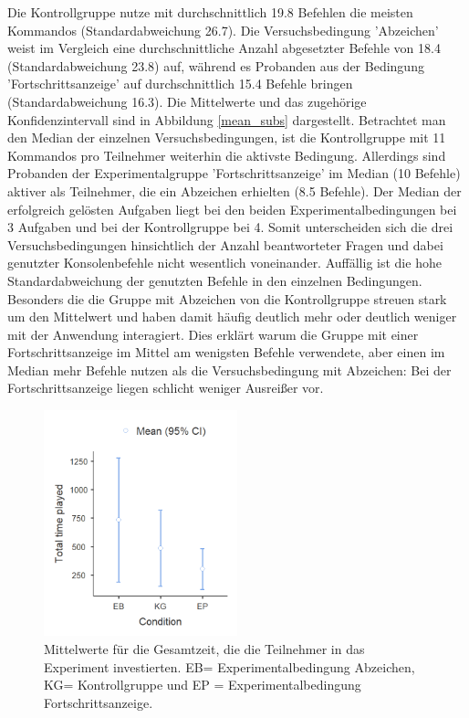 Die Kontrollgruppe nutze mit durchschnittlich 19.8 Befehlen die meisten Kommandos (Standardabweichung 26.7). Die Versuchsbedingung 'Abzeichen' weist im Vergleich eine durchschnittliche Anzahl abgesetzter Befehle von 18.4 (Standardabweichung 23.8) auf, während es Probanden aus der Bedingung 'Fortschrittsanzeige' auf durchschnittlich 15.4 Befehle bringen (Standardabweichung 16.3). Die Mittelwerte und das zugehörige Konfidenzintervall sind in Abbildung \ref{mean_subs} dargestellt. Betrachtet man den Median der einzelnen Versuchsbedingungen, ist die Kontrollgruppe mit 11 Kommandos pro Teilnehmer weiterhin die aktivste Bedingung. Allerdings sind Probanden der Experimentalgruppe 'Fortschrittsanzeige' im Median (10 Befehle) aktiver als Teilnehmer, die ein Abzeichen erhielten (8.5 Befehle). Der Median der erfolgreich gelösten Aufgaben liegt bei den beiden Experimentalbedingungen bei 3 Aufgaben und bei der Kontrollgruppe bei 4. Somit unterscheiden sich die drei Versuchsbedingungen hinsichtlich der Anzahl beantworteter Fragen und dabei genutzter Konsolenbefehle nicht wesentlich voneinander. Auffällig ist die hohe Standardabweichung der genutzten Befehle in den einzelnen Bedingungen. Besonders die die Gruppe mit Abzeichen von die Kontrollgruppe streuen stark um den Mittelwert und haben damit häufig deutlich mehr oder deutlich weniger mit der Anwendung interagiert. Dies erklärt warum die Gruppe mit einer Fortschrittsanzeige im Mittel am wenigsten Befehle verwendete, aber einen im Median mehr Befehle nutzen als die Versuchsbedingung mit Abzeichen: Bei der Fortschrittsanzeige liegen schlicht weniger Ausreißer vor.  

\begin{figure}[htbp]
    \centering
    \includegraphics[width=0.5\textwidth]{img/auswertung/mean_time.png}
    \caption{Mittelwerte für die Gesamtzeit, die die Teilnehmer in das Experiment investierten. EB= Experimentalbedingung Abzeichen, KG= Kontrollgruppe und EP = Experimentalbedingung Fortschrittsanzeige.}
    \label{mean_time}
\end{figure}

